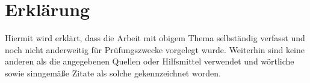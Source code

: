 \chapter*{Erklärung}

Hiermit wird erklärt, dass die Arbeit mit obigem Thema selbständig verfasst und noch nicht anderweitig für Prüfungszwecke vorgelegt wurde. Weiterhin sind keine anderen als die angegebenen Quellen oder Hilfsmittel verwendet und wörtliche sowie sinngemäße Zitate als solche gekennzeichnet worden. \\[2cm]


